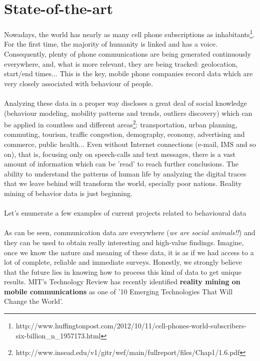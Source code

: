 \newpage

\section{State-of-the-art}

Nowadays, the world has nearly as many cell phone subscriptions as inhabitants\footnote{http://www.huffingtonpost.com/2012/10/11/cell-phones-world-subscribers-six-billion_n_1957173.html}. For the first time, the majority of humanity is linked and has a voice. Consequently, plenty of phone communications are being generated continuously everywhere, and, what is more relevant, they are being tracked: geolocation, start/end times... This is the key, mobile phone companies record data which are very closely associated with behaviour of people.
\\
\\
Analyzing these data in a proper way discloses a great deal of social knowledge (behaviour modeling, mobility patterns and trends, outliers discovery) which can be applied in countless and different areas\footnote{http://www.insead.edu/v1/gitr/wef/main/fullreport/files/Chap1/1.6.pdf}: transportation, urban planning, commuting, tourism, traffic congestion, demography, economy, advertising and commerce, public health... Even without Internet connections (e-mail, IMS and so on), that is, focusing only on speech-calls and text messages, there is a vast amount of information which can be 'read' to reach further conclusions. The ability to understand the patterns of human life by analyzing the digital traces that we leave behind will transform the world, specially poor nations. Reality mining of behavior data is just beginning.
\\
\\
Let’s enumerate a few examples of current projects related to behavioural data
\\
\\
As can be seen, communication data are everywhere ({\it we are social animals!!}) and they can be used to obtain really interesting and high-value findings. Imagine, once we know the nature and meaning of these data, it is as if we had access to a lot of complete, reliable and immediate surveys. Honestly, we strongly believe that the future lies in knowing how to process this kind of data to get unique results. MIT's Technology Review has recently identified {\bf reality mining on mobile communications} as one of '10 Emerging Technologies That Will Change the World'.
\\
